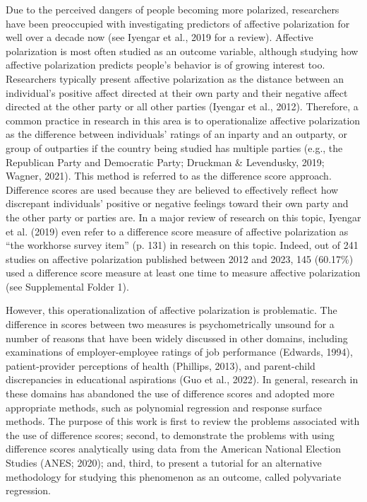 \documentclass[authordate, meta, issue]{jote-new-article}
\begin{document}
	Due to the perceived dangers of people becoming more polarized, researchers have been preoccupied with investigating predictors of affective polarization for well over a decade now (see Iyengar et al., 2019 for a review). Affective polarization is most often studied as an outcome variable, although studying how affective polarization predicts people's behavior is of growing interest too. Researchers typically present affective polarization as the distance between an individual's positive affect directed at their own party and their negative affect directed at the other party or all other parties (Iyengar et al., 2012). Therefore, a common practice in research in this area is to operationalize affective polarization as the difference between individuals' ratings of an inparty and an outparty, or group of outparties if the country being studied has multiple parties (e.g., the Republican Party and Democratic Party; Druckman \& Levendusky, 2019; Wagner, 2021). This method is referred to as the difference score approach. Difference scores are used because they are believed to effectively reflect how discrepant individuals' positive or negative feelings toward their own party and the other party or parties are. In a major review of research on this topic, Iyengar et al. (2019) even refer to a difference score measure of affective polarization as “the workhorse survey item” (p. 131) in research on this topic. Indeed, out of 241 studies on affective polarization published between 2012 and 2023, 145 (60.17\%) used a difference score measure at least one time to measure affective polarization (see Supplemental Folder 1).



	However, this operationalization of affective polarization is problematic. The difference in scores between two measures is psychometrically unsound for a number of reasons that have been widely discussed in other domains, including examinations of employer-employee ratings of job performance (Edwards, 1994), patient-provider perceptions of health (Phillips, 2013), and parent-child discrepancies in educational aspirations (Guo et al., 2022). In general, research in these domains has abandoned the use of difference scores and adopted more appropriate methods, such as polynomial regression and response surface methods. The purpose of this work is first to review the problems associated with the use of difference scores; second, to demonstrate the problems with using difference scores analytically using data from the American National Election Studies (ANES; 2020); and, third, to present a tutorial for an alternative methodology for studying this phenomenon as an outcome, called polyvariate regression.
\end{document}

